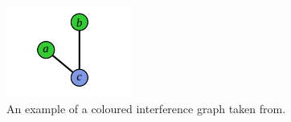 \begin{figure}[tp]
  \centering
  \includegraphics[scale=0.5]{Graphics/interferencegraph.png}
  \caption{An example of a coloured interference graph taken from\cite{ITU_liveness}.}
  \label{fig:interferencegraph}
\end{figure}
